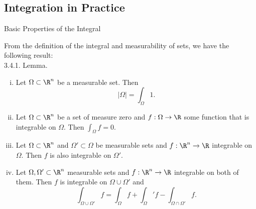 \documentclass[smaller,hyperref={CJKbookmarks=true}]{beamer}
\begin{document}
\subsection{Integration in Practice}
\begin{frame}[c]
\begin{spacing}{2.5}
\tableofcontents[sectionstyle=hide,subsectionstyle=show/shaded/hide]
\end{spacing}
\end{frame}
\begin{frame}[t]{Basic Properties of the Integral}
\begin{spacing}{1}
From the definition of the integral and measurability of sets, we have the
following result:\\[4pt]
\alert{3.4.1. Lemma.}
\begin{enumerate}[(i)]
  \item Let $\Omega\subset\R^n$ be a measurable set. Then
      \[|\Omega|=\int_\Omega1.\]
  \item Let $\Omega\subset\R^n$ be a set of measure zero and $f:\Omega\to\R$ some function that is integrable on $\Omega$. Then $\int_\Omega f=0$.
  \item Let $\Omega\subset\R^n$ and $\Omega'\subset\Omega$ be measurable sets and $f:\R^n\to\R$ integrable on $\Omega$. Then $f$ is also integrable on $\Omega'$.
  \item Let $\Omega,\Omega'\subset\R^n$ measurable sets and $f:\R^n\to\R$ integrable on both of them. Then $f$ is integrable on $\Omega\cup\Omega'$ and
      \[\int_{\Omega\cup\Omega'}f=\int_\Omega f+\int_\Omega'f-\int_{\Omega\cap\Omega'}f.\]
\end{enumerate}
\end{spacing}
\end{frame}
\end{document}
